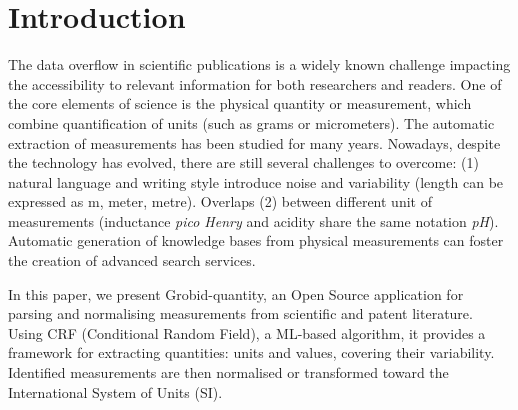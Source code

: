 \documentclass[sigconf]{acmart}
\begin{document}


\maketitle

\section{Introduction}

The data overflow in scientific publications is a widely known challenge impacting the accessibility to relevant information for both researchers and readers. 
One of the core elements of science is the physical quantity or measurement, which combine quantification of units (such as grams or micrometers). The automatic extraction of measurements has been studied for many years. Nowadays, despite the technology has evolved, there are still several challenges to overcome: (1) natural language and writing style introduce noise and variability (length can be expressed as m, meter, metre). Overlaps (2) between different unit of measurements (inductance \textit{pico Henry} and acidity share the same notation \textit{pH}). Automatic generation of knowledge bases from physical measurements can foster the creation of advanced search services. 

In this paper, we present Grobid-quantity, an Open Source application \cite{grobid-quantities} for parsing and normalising measurements from scientific and patent literature. Using CRF (Conditional Random Field), a ML-based algorithm, it provides a framework for extracting quantities: units and values, covering their variability. Identified measurements are then normalised or transformed toward the International System of Units (SI). 
\end{document}
